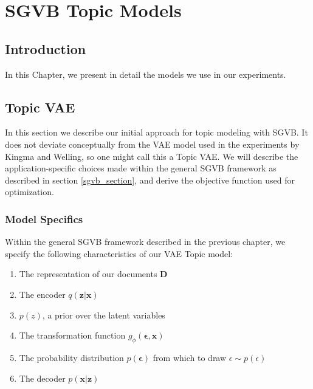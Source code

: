 \documentclass{report}
\begin{document}
\chapter{SGVB Topic Models}
\section{Introduction}
In this Chapter, we present in detail the models we use in our experiments. 

\section{Topic VAE}

In this section we describe our initial approach for topic modeling with SGVB. It does not deviate conceptually from the VAE model used in the experiments by Kingma and Welling\cite{kingma2013auto}, so one might call this a Topic VAE. We will describe the application-specific choices made within the general SGVB framework as described in section \ref{sgvb_section}, and derive the objective function used for optimization. 

\subsection{Model Specifics}

Within the general SGVB framework described in the previous chapter, we specify the following characteristics of our VAE Topic model:

\begin{enumerate}
	\item The representation of our documents $\mathbf{D}$
	\item The encoder $q(\mathbf{z}|\mathbf{x})$
	\item $p(z)$, a prior  over the latent variables
	\item The transformation function $g_\phi(\boldsymbol{\epsilon},\mathbf{x})$
	\item The  probability distribution  $p(\mathbf{\epsilon})$ from which to draw $\epsilon \sim p(\epsilon)$
	\item The decoder $p(\mathbf{x}|\mathbf{z})$
\end{enumerate}
\end{document}
